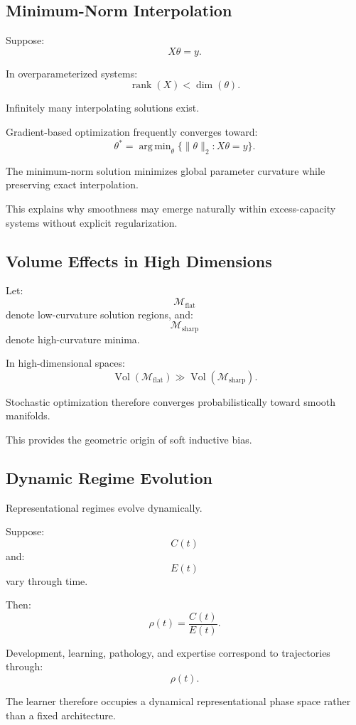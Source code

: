 \documentclass[12pt,a4paper]{article}
\DeclareMathOperator*{\argmin}{arg\,min}
\begin{document}
\subsection{Minimum-Norm Interpolation}

Suppose:
\[
X\theta
=
y.
\]

In overparameterized systems:
\[
\operatorname{rank}(X)
<
\dim(\theta).
\]

Infinitely many interpolating solutions exist.

Gradient-based optimization frequently converges toward:
\[
\theta^\ast
=
\argmin_\theta
\{
\|\theta\|_2
:
X\theta=y
\}.
\]

The minimum-norm solution minimizes global parameter curvature while preserving exact interpolation.

This explains why smoothness may emerge naturally within excess-capacity systems without explicit regularization.

\subsection{Volume Effects in High Dimensions}

Let:
\[
\mathcal{M}_{\text{flat}}
\]
denote low-curvature solution regions,
and:
\[
\mathcal{M}_{\text{sharp}}
\]
denote high-curvature minima.

In high-dimensional spaces:
\[
\operatorname{Vol}(\mathcal{M}_{\text{flat}})
\gg
\operatorname{Vol}(\mathcal{M}_{\text{sharp}}).
\]

Stochastic optimization therefore converges probabilistically toward smooth manifolds.

This provides the geometric origin of soft inductive bias.

\subsection{Dynamic Regime Evolution}

Representational regimes evolve dynamically.

Suppose:
\[
C(t)
\]
and:
\[
E(t)
\]
vary through time.

Then:
\[
\rho(t)
=
\frac{C(t)}{E(t)}.
\]

Development, learning, pathology, and expertise correspond to trajectories through:
\[
\rho(t).
\]

The learner therefore occupies a dynamical representational phase space rather than a fixed architecture.
\end{document}
